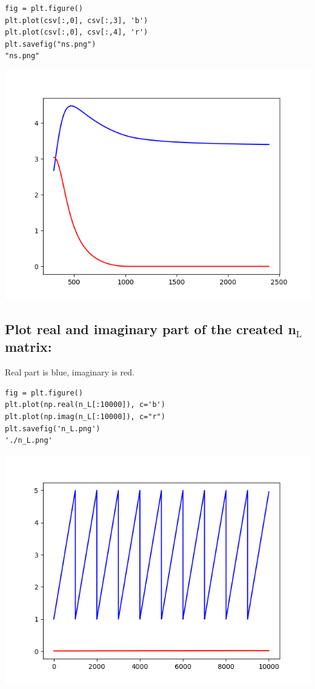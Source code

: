 \documentclass[11pt]{article}
\begin{document}
\begin{verbatim}
fig = plt.figure()
plt.plot(csv[:,0], csv[:,3], 'b')
plt.plot(csv[:,0], csv[:,4], 'r')
plt.savefig("ns.png")
"ns.png"
\end{verbatim}

\begin{center}
\includegraphics[width=.9\linewidth]{ns.png}
\end{center}
\subsection{Plot real and imaginary part of the created n\(_{\text{L}}\) matrix:}
\label{sec:org5642da3}

Real part is blue, imaginary is red.

\begin{verbatim}
fig = plt.figure()
plt.plot(np.real(n_L[:10000]), c='b')
plt.plot(np.imag(n_L[:10000]), c="r")
plt.savefig('n_L.png')
'./n_L.png'

\end{verbatim}

\begin{center}
\includegraphics[width=.9\linewidth]{./n_L.png}
\end{center}
\end{document}
